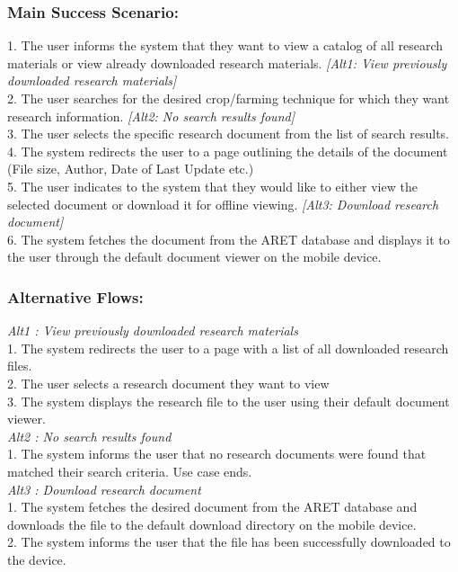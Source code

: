 \documentclass[12pt,letterpaper]{article}
\begin{document}
\subsubsection*{Main Success Scenario:}
1. The user informs the system that they want to view a catalog of all research materials or view already downloaded research materials. \emph{[Alt1: View previously downloaded research materials]}\\
2. The user searches for the desired crop/farming technique for which they want research information. \emph{[Alt2: No search results found]}\\
3. The user selects the specific research document from the list of search results.\\
4. The system redirects the user to a page outlining the details of the document (File size, Author, Date of Last Update etc.)\\
5. The user indicates to the system that they would like to either view the selected document or download it for offline viewing. \emph{[Alt3: Download research document]}\\
6. The system fetches the document from the ARET database and displays it to the user through the default document viewer on the mobile device.

\subsubsection*{Alternative Flows:}
\emph{Alt1 : View previously downloaded research materials}\\
1. The system redirects the user to a page with a list of all downloaded research files.\\
2. The user selects a research document they want to view\\
3. The system displays the research file to the user using their default document viewer.\\[10pt]
\emph{Alt2 : No search results found}\\
1. The system informs the user that no research documents were found that matched their search criteria. Use case ends. \\[10pt]
\emph{Alt3 : Download research document}\\
1. The system fetches the desired document from the ARET database and downloads the file to the default download directory on the mobile device.\\
2. The system informs the user that the file has been successfully downloaded to the device.
\end{document}
